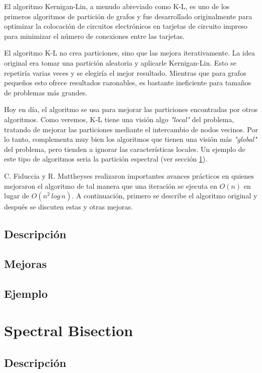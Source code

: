 El algoritmo Kernigan-Lin\cite{KernighanLin}, a menudo abreviado como K-L, es uno de los primeros algoritmos de partición de grafos y fue desarrollado originalmente para optimizar la colocación de circuitos electrónicos en tarjetas de circuito impreso para minimizar el número de conexiones entre las tarjetas.

El algoritmo K-L no crea particiones, sino que las mejora iterativamente. La idea original era tomar una partición aleatoria y aplicarle Kernigan-Lin. Esto se repetiría varias veces y se elegiría el mejor resultado. Mientras que para grafos pequeños esto ofrece resultados razonables, es bastante ineficiente para tamaños de problemas más grandes.

Hoy en día, el algoritmo se usa para mejorar las particiones encontradas por otros algoritmos. Como veremos, K-L tiene una visión algo \textit{"local"} del problema, tratando de mejorar las particiones mediante el intercambio de nodos vecinos. Por lo tanto, complementa muy bien los algoritmos que tienen una visión más \textit{"global"} del problema, pero tienden a ignorar las características locales. Un ejemplo de este tipo de algoritmos seria la partición espectral (ver sección \ref{spectral_bisection}).

C. Fiduccia y R. Mattheyses realizaron importantes avances prácticos en \cite{FiducciaMattheyses} quienes mejoraron el algoritmo de tal manera que una iteración se ejecuta en $O(n)$ en lugar de $O({n}^2 \, log \, n)$. A continuación, primero se describe el algoritmo original y después se discuten estas y otras mejoras.

\subsection{Descripción}

\subsection{Mejoras}

\subsection{Ejemplo}


\section{Spectral Bisection}\label{spectral_bisection}

\subsection{Descripción}

